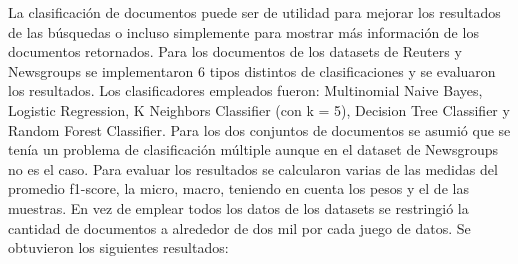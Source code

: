 \documentclass[12pt]{llncs}
\begin{document}
La clasificación de documentos puede ser de utilidad para mejorar los resultados de las búsquedas o incluso simplemente para mostrar más información de los documentos retornados. Para los documentos de los datasets de Reuters y Newsgroups se implementaron 6 tipos distintos de clasificaciones y se evaluaron los resultados. Los clasificadores empleados fueron: Multinomial Naive Bayes, Logistic Regression, K Neighbors Classifier (con k = 5), Decision Tree Classifier y Random Forest Classifier. Para los dos conjuntos de documentos se asumió que se tenía un problema de clasificación múltiple aunque en el dataset de Newsgroups no es el caso. Para evaluar los resultados se calcularon varias de las medidas del promedio f1-score, la micro, macro, teniendo en cuenta los pesos y el de las muestras. En vez de emplear todos los datos de los datasets se restringió la cantidad de documentos a alrededor de dos mil por cada juego de datos. Se obtuvieron los siguientes resultados:
\end{document}
